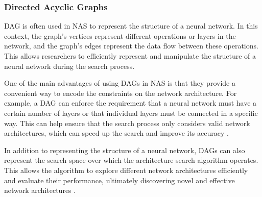 \subsubsection{Directed Acyclic Graphs}
\Gls{DAG} is often used in \gls{NAS} to represent the structure of a neural network. In this context, the graph's vertices represent different operations or layers in the network, and the graph's edges represent the data flow between these operations. This allows researchers to efficiently represent and manipulate the structure of a neural network during the search process.

One of the main advantages of using \glspl{DAG} in \gls{NAS} is that they provide a convenient way to encode the constraints on the network architecture. For example, a \gls{DAG} can enforce the requirement that a neural network must have a certain number of layers or that individual layers must be connected in a specific way. This can help ensure that the search process only considers valid network architectures, which can speed up the search and improve its accuracy \autocite{https://doi.org/10.48550/arxiv.1806.09055}. 

In addition to representing the structure of a neural network, \glspl{DAG} can also represent the search space over which the architecture search algorithm operates. This allows the algorithm to explore different network architectures efficiently and evaluate their performance, ultimately discovering novel and effective network architectures \autocite{inproceedings}. 
